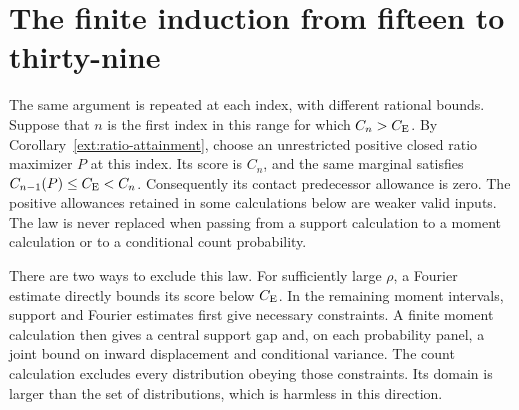 \section{The finite induction from fifteen to thirty-nine}
\label{ext:finite1539}
The same argument is repeated at each index, with different rational
bounds. Suppose that $n$ is the first index in this range for which
$C_n>C_{\mathrm E}$. By Corollary~\ref{ext:ratio-attainment}, choose an unrestricted
positive closed ratio maximizer $P$ at this index. Its score is $C_n$,
and the same marginal satisfies $C_{n-1}(P)\le C_{\mathrm E}<C_n$.
Consequently its contact predecessor allowance is zero. The positive
allowances retained in some calculations below are weaker valid inputs.
The law is never replaced when passing from a support calculation to a
moment calculation or to a conditional count probability.

There are two ways to exclude this law. For sufficiently large $\rho$,
a Fourier estimate directly bounds its score below $C_{\mathrm E}$. In the
remaining moment intervals, support and Fourier estimates first give
necessary constraints. A finite moment calculation then gives a central
support gap and, on each probability panel, a joint bound on inward
displacement and conditional variance. The count calculation excludes
every distribution obeying those constraints. Its domain is larger than
the set of distributions, which is harmless in this direction.

